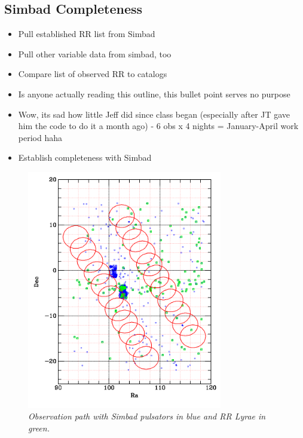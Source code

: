 \documentclass[aps,prl,twocolumn,superscriptaddress]{revtex4-1}
\begin{document}
\subsection{Simbad Completeness}
	\begin{itemize}
		\item{} Pull established RR list from Simbad
		\item{} Pull other variable data from simbad, too
		\item{} Compare list of observed RR to catalogs
		\item{} Is anyone actually reading this outline, this bullet point serves no purpose
		\item{} Wow, its sad how little Jeff did since class began (especially after JT gave him the code to do it a month ago) - 6 obs x 4 nights = January-April work period haha
		\item{} Establish completeness with Simbad
	\end{itemize}
\begin{figure}[H]
 \centering
 	\includegraphics[width=3.35in]{figures/simbadoverlap.png}
 \caption{\it \small{Observation path with Simbad pulsators in blue and RR Lyrae in green.}}
 \label{fig:simoverlap}
\end{figure}
\end{document}

